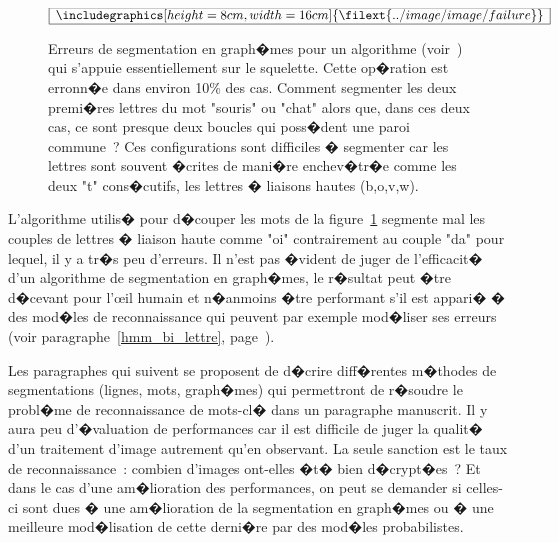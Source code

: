         
            \begin{figure}[t]
        $$\frame{$\begin{array}[c]{c}\includegraphics[height=8cm, width=16cm]
        {\filext{../image/image/failure}}\end{array}$}$$
        \caption{      Erreurs de segmentation en graph�mes pour un algorithme (voir~) 
                                qui s'appuie 
                                essentiellement sur le squelette. Cette op�ration est erronn�e dans environ 10\% des cas.
                                Comment segmenter les deux premi�res lettres du mot "souris" ou "chat" alors que, dans ces
                                deux cas, ce sont presque deux boucles qui poss�dent une paroi commune~? Ces configurations
                                sont difficiles � segmenter car les lettres sont souvent �crites de mani�re enchev�tr�e
                                comme les deux "t" cons�cutifs, les lettres � liaisons hautes (b,o,v,w).}
        \label{image_grapheme_erreur}
            \end{figure}
            
                                
L'algorithme utilis� pour d�couper les mots de la figure~\ref{image_grapheme_erreur} segmente mal les couples de lettres � liaison haute comme "oi" contrairement au couple "da" pour lequel, il y a tr�s peu d'erreurs. Il n'est pas �vident de juger de l'efficacit� d'un algorithme de segmentation en graph�mes, le r�sultat peut �tre d�cevant pour l'\oe il humain et n�anmoins �tre performant s'il est appari� � des mod�les de reconnaissance qui peuvent par exemple mod�liser ses erreurs (voir paragraphe~\ref{hmm_bi_lettre}, page~\pageref{hmm_bi_lettre}). 

Les paragraphes qui suivent se proposent de d�crire diff�rentes m�thodes de segmentations (lignes, mots, graph�mes) qui permettront de r�soudre le probl�me de reconnaissance de mots-cl� dans un paragraphe manuscrit. Il y aura peu d'�valuation de performances car il est difficile de juger la qualit� d'un traitement d'image autrement qu'en observant. La seule sanction est le taux de reconnaissance~: combien d'images ont-elles �t� bien d�crypt�es~? Et dans le cas d'une am�lioration des performances, on peut se demander si celles-ci sont dues � une am�lioration de la segmentation en graph�mes ou � une meilleure mod�lisation de cette derni�re par des mod�les probabilistes.


